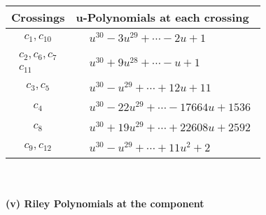 \documentclass[1p]{elsarticle_modified}
\theoremstyle{definition}
\begin{document}
\begin{tabular}{m{50pt}|m{274pt}}
Crossings & \hspace{64pt}u-Polynomials at each crossing \\
\hline $$\begin{aligned}c_{1},c_{10}\end{aligned}$$&$\begin{aligned}
&u^{30}-3 u^{29}+\cdots-2 u+1
\end{aligned}$\\
\hline $$\begin{aligned}c_{2},c_{6},c_{7}\\c_{11}\end{aligned}$$&$\begin{aligned}
&u^{30}+9 u^{28}+\cdots- u+1
\end{aligned}$\\
\hline $$\begin{aligned}c_{3},c_{5}\end{aligned}$$&$\begin{aligned}
&u^{30}- u^{29}+\cdots+12 u+11
\end{aligned}$\\
\hline $$\begin{aligned}c_{4}\end{aligned}$$&$\begin{aligned}
&u^{30}-22 u^{29}+\cdots-17664 u+1536
\end{aligned}$\\
\hline $$\begin{aligned}c_{8}\end{aligned}$$&$\begin{aligned}
&u^{30}+19 u^{29}+\cdots+22608 u+2592
\end{aligned}$\\
\hline $$\begin{aligned}c_{9},c_{12}\end{aligned}$$&$\begin{aligned}
&u^{30}- u^{29}+\cdots+11 u^2+2
\end{aligned}$\\
\hline
\end{tabular}\\~\\
\newpage\renewcommand{\arraystretch}{1}
\flushleft \textbf{(v) Riley Polynomials at the component}\newline \\
\end{document}
